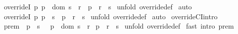 \begin{isabellebody}
\ overrideI{}{\isacharcolon}\ {\isachardoublequoteopen}{\isacharbang}{\isacharbang}p{\isachardot}\ p\ {\isacharcolon}\ dom\ s\ {\isacharless}{\isacharminus}{\isacharcolon}\ r\ {\isacharequal}{\isacharequal}{\isachargreater}\ p\ {\isacharcolon}\ {\isacharparenleft}r\ {\isacharparenleft}{\isacharplus}{\isacharparenright}\ s{\isacharparenright}{\isachardoublequoteclose}\isanewline
%
\isadelimproof
%
\endisadelimproof
%
\isatagproof
{}\isamarkupfalse%
\ {\isacharparenleft}unfold\ override{\isacharunderscore}def{\isacharparenright}\isanewline
{}\isamarkupfalse%
\ auto\isanewline
{}\isamarkupfalse%
%
\endisatagproof
{\isafoldproof}%
%
\isadelimproof
\isanewline
%
\endisadelimproof
\isanewline
{}\isamarkupfalse%
\ overrideI{}{\isacharcolon}\ {\isachardoublequoteopen}{\isacharbang}{\isacharbang}p{\isachardot}\ p\ {\isacharcolon}\ s\ {\isacharequal}{\isacharequal}{\isachargreater}\ p\ {\isacharcolon}\ {\isacharparenleft}r\ {\isacharparenleft}{\isacharplus}{\isacharparenright}\ s{\isacharparenright}{\isachardoublequoteclose}\isanewline
%
\isadelimproof
%
\endisadelimproof
%
\isatagproof
{}\isamarkupfalse%
\ {\isacharparenleft}unfold\ override{\isacharunderscore}def{\isacharparenright}\isanewline
{}\isamarkupfalse%
\ auto\isanewline
{}\isamarkupfalse%
%
\endisatagproof
{\isafoldproof}%
%
\isadelimproof
\isanewline
%
\endisadelimproof
\isanewline
{}\isamarkupfalse%
\ overrideCI{\isacharbrackleft}intro{\isacharbang}{\isacharbrackright}{\isacharcolon}\isanewline
{}\ prem{\isacharcolon}\ {\isachardoublequoteopen}{\isacharparenleft}\ p\ {\isachartilde}{\isacharcolon}\ s\ {\isacharequal}{\isacharequal}{\isachargreater}\ \ p\ {\isacharcolon}\ {\isacharparenleft}dom\ s{\isacharparenright}\ {\isacharless}{\isacharminus}{\isacharcolon}\ r{\isacharparenright}{\isachardoublequoteclose}\isanewline
{}\ {\isachardoublequoteopen}p\ {\isacharcolon}\ {\isacharparenleft}r\ {\isacharparenleft}{\isacharplus}{\isacharparenright}\ s{\isacharparenright}{\isachardoublequoteclose}\isanewline
%
\isadelimproof
%
\endisadelimproof
%
\isatagproof
{}\isamarkupfalse%
\ {\isacharparenleft}unfold\ override{\isacharunderscore}def{\isacharparenright}\isanewline
{}\isamarkupfalse%
\ {\isacharparenleft}fast\ intro{\isacharbang}{\isacharcolon}\ prem{\isacharparenright}\isanewline
{}\isamarkupfalse%
%
\endisatagproof
{\isafoldproof}%
%
\isadelimproof
\isanewline
%
\endisadelimproof

\end{isabellebody}
